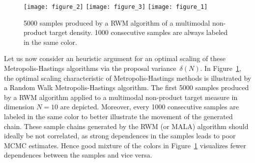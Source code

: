 \begin{figure}%
 \begin{center} 
  \texttt{[image: figure\_2]}
  \vspace*{1mm}
  \label{fig:3DscatterplotRWM-small}
  \vspace*{3mm}
  \texttt{[image: figure\_3]}
  \vspace*{1mm}
  \label{fig:3DscatterplotRWM-large}
  \vspace*{3mm}
  \texttt{[image: figure\_1]}
  \vspace*{1mm}
  \label{fig:3DscatterplotRWM-optimal}
 \end{center}
  \caption{5000 samples produced by a RWM algorithm of a multimodal non-product target density. 1000 consecutive samples are always labeled in the same color.}
  \label{fig:3DscatterplotRWM}
\end{figure}

Let us now consider an heuristic argument for an optimal scaling of these Metropolis-Hastings algorithms via the proposal variance~$\delta(N)$. In Figure~\ref{fig:3DscatterplotRWM}, the optimal scaling characteristic of Metropolis-Hastings methods is illustrated by a Random Walk Metropolis-Hastings algorithm. The first 5000 samples produced by a RWM algorithm applied to a multimodal non-product target measure in dimension $N=10$ are depicted. Moreover, every 1000 consecutive samples are labeled in the same color to better illustrate the movement of the generated chain. These sample chains generated by the RWM (or MALA) algorithm should ideally be not correlated, as strong dependences in the samples leads to poor MCMC estimates. Hence good mixture of the colors in Figure~\ref{fig:3DscatterplotRWM} visualizes fewer dependences between the samples and vice versa. 

